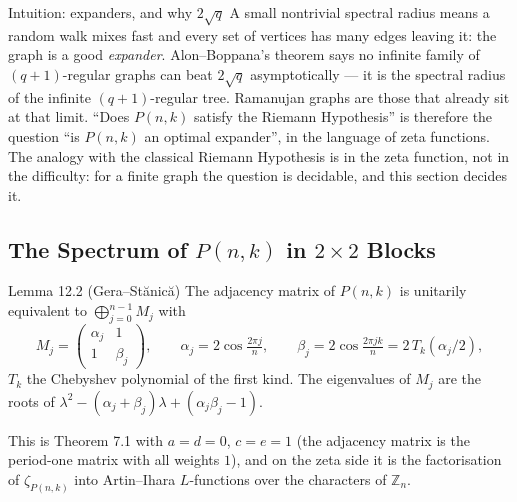 \documentclass[11pt]{article}
\begin{document}
\begin{intubox}{Intuition: expanders, and why $2\sqrt q$}
A small nontrivial spectral radius means a random walk mixes fast and every set of vertices has many edges leaving it: the graph is a good \emph{expander}. Alon--Boppana's theorem says no infinite family of $(q+1)$-regular graphs can beat $2\sqrt q$ asymptotically --- it is the spectral radius of the infinite $(q+1)$-regular tree. Ramanujan graphs are those that already sit at that limit. ``Does $P(n,k)$ satisfy the Riemann Hypothesis'' is therefore the question ``is $P(n,k)$ an optimal expander'', in the language of zeta functions. The analogy with the classical Riemann Hypothesis is in the zeta function, not in the difficulty: for a finite graph the question is decidable, and this section decides it.
\end{intubox}

\subsection{The Spectrum of $P(n,k)$ in $2\times2$ Blocks}

\begin{thmbox}{Lemma 12.2 (Gera--St\u{a}nic\u{a})}
The adjacency matrix of $P(n,k)$ is unitarily equivalent to $\bigoplus_{j=0}^{n-1}M_j$ with
\begin{equation}
  M_j=\begin{pmatrix}\alpha_j&1\\1&\beta_j\end{pmatrix},\qquad
  \alpha_j=2\cos\tfrac{2\pi j}{n},\qquad \beta_j=2\cos\tfrac{2\pi jk}{n}=2\,T_k(\alpha_j/2),
\end{equation}
$T_k$ the Chebyshev polynomial of the first kind. The eigenvalues of $M_j$ are the roots of $\lambda^2-(\alpha_j+\beta_j)\lambda+(\alpha_j\beta_j-1)$.
\end{thmbox}
This is Theorem 7.1 with $a=d=0$, $c=e=1$ (the adjacency matrix is the period-one matrix with all weights $1$), and on the zeta side it is the factorisation of $\zeta_{P(n,k)}$ into Artin--Ihara $L$-functions over the characters of $\mathbb Z_n$.
\end{document}
